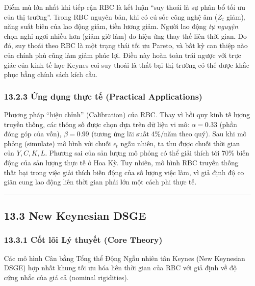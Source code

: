 \documentclass[
]{article}
\begin{document}
Điểm mù lớn nhất khi tiếp cận RBC là kết luận ``suy thoái là sự phân bổ
tối ưu của thị trường''. Trong RBC nguyên bản, khi có cú sốc công nghệ
âm (\(Z_t\) giảm), năng suất biên của lao động giảm, tiền lương giảm.
Người lao động \emph{tự nguyện} chọn nghỉ ngơi nhiều hơn (giảm giờ làm)
do hiệu ứng thay thế liên thời gian. Do đó, suy thoái theo RBC là một
trạng thái tối ưu Pareto, và bất kỳ can thiệp nào của chính phủ cũng làm
giảm phúc lợi. Điều này hoàn toàn trái ngược với trực giác của kinh tế
học Keynes coi suy thoái là thất bại thị trường có thể được khắc phục
bằng chính sách kích cầu.

\subsubsection{13.2.3 Ứng dụng thực tế (Practical
Applications)}\label{ux1ee9ng-dux1ee5ng-thux1ef1c-tux1ebf-practical-applications-47}

Phương pháp ``hiệu chỉnh'' (Calibration) của RBC. Thay vì hồi quy kinh
tế lượng truyền thống, các thông số được chọn dựa trên dữ liệu vi mô:
\(\alpha = 0.33\) (phần đóng góp của vốn), \(\beta = 0.99\) (tương ứng
lãi suất 4\%/năm theo quý). Sau khi mô phỏng (simulate) mô hình với
chuỗi \(\epsilon_t\) ngẫu nhiên, ta thu được chuỗi thời gian của
\(Y, C, K, L\). Phương sai của sản lượng mô phỏng có thể giải thích tới
70\% biến động của sản lượng thực tế ở Hoa Kỳ. Tuy nhiên, mô hình RBC
truyền thống thất bại trong việc giải thích biến động của số lượng việc
làm, vì giả định độ co giãn cung lao động liên thời gian phải lớn một
cách phi thực tế.

\begin{center}\rule{0.5\linewidth}{0.5pt}\end{center}

\subsection{13.3 New Keynesian DSGE}\label{new-keynesian-dsge}

\subsubsection{13.3.1 Cốt lõi Lý thuyết (Core
Theory)}\label{cux1ed1t-luxf5i-luxfd-thuyux1ebft-core-theory-41}

Các mô hình Cân bằng Tổng thể Động Ngẫu nhiên tân Keynes (New Keynesian
DSGE) hợp nhất khung tối ưu hóa liên thời gian của RBC với giả định về
độ cứng nhắc của giá cả (nominal rigidities).
\end{document}

